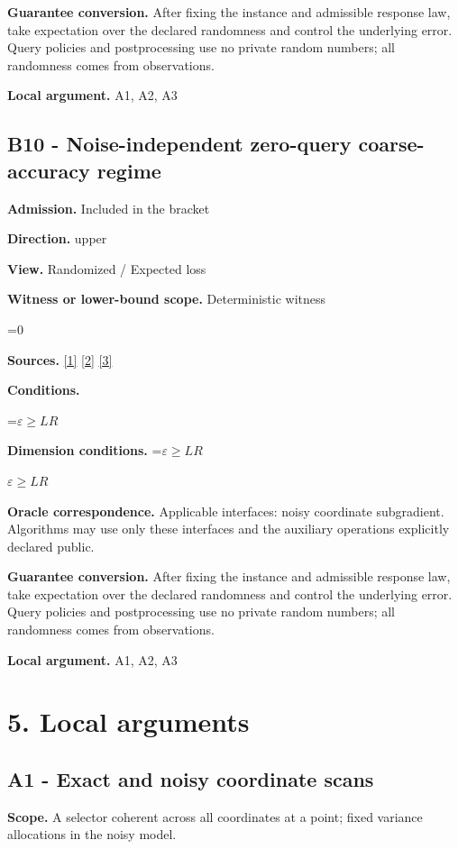 \documentclass[10pt,a4paper]{article}
\newcommand{\AtlasMath}[1]{\par\begingroup\centering\setbox0=\hbox{$\displaystyle #1$}\ifdim\wd0>1.4\linewidth\typeout{ATLAS WIDE FORMULA: \the\wd0}\fi\ifdim\wd0>\linewidth\resizebox{\linewidth}{!}{\box0}\else\box0\fi\par\endgroup}
\newcommand{\AtlasInlineMath}[1]{\begingroup\setbox0=\hbox{$#1$}\ifdim\wd0>.4\linewidth\endgroup\AtlasMath{#1}\else\endgroup$#1$\fi}
\begin{document}
\textbf{Guarantee conversion.} After fixing the instance and admissible response law, take expectation over the declared randomness and control the underlying error. Query policies and postprocessing use no private random numbers; all randomness comes from observations.

\textbf{Local argument.} A1, A2, A3

\subsection{B10 - Noise-independent zero-query coarse-accuracy regime}
\textbf{Admission.} Included in the bracket

\textbf{Direction.} upper

\textbf{View.} Randomized / Expected loss

\textbf{Witness or lower-bound scope.} Deterministic witness

\AtlasMath{0}
\textbf{Sources.} \href{https://arxiv.org/pdf/1405.4980}{[1]} \href{https://www2.isye.gatech.edu/~nemirovs/MOR_AccuracyCertificates.pdf}{[2]} \href{https://arxiv.org/pdf/2609.20701}{[3]}

\textbf{Conditions.} 
\AtlasMath{\varepsilon\ge LR}


\textbf{Dimension conditions.} \AtlasInlineMath{\varepsilon\ge LR}

\textbf{Oracle correspondence.} Applicable interfaces: noisy coordinate subgradient. Algorithms may use only these interfaces and the auxiliary operations explicitly declared public.

\textbf{Guarantee conversion.} After fixing the instance and admissible response law, take expectation over the declared randomness and control the underlying error. Query policies and postprocessing use no private random numbers; all randomness comes from observations.

\textbf{Local argument.} A1, A2, A3

\section{5. Local arguments}
\subsection{A1 - Exact and noisy coordinate scans}
\textbf{Scope.} A selector coherent across all coordinates at a point; fixed variance allocations in the noisy model.
\end{document}
